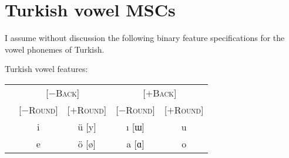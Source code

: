 \section{Turkish vowel MSCs}

\citet{Zimmer1969}

I assume without discussion the following binary feature specifications for the vowel phonemes of Turkish.

\ex Turkish vowel features: \vspace{6pt} \\
\begin{tabular}{c | c c c c}
                       & \multicolumn{2}{c}{[$-$\textsc{Back}]} & \multicolumn{2}{c}{[$+$\textsc{Back}]} \\
                       & [$-$\textsc{Round}] & [$+$\textsc{Round}] & [$-$\textsc{Round}] & [$+$\textsc{Round}] \\ \midrule
{} & i & ü [y] & ı [ɯ] & u \\
 & e & ö [ø] & a [ɑ] & o \\
\end{tabular}
\xe




